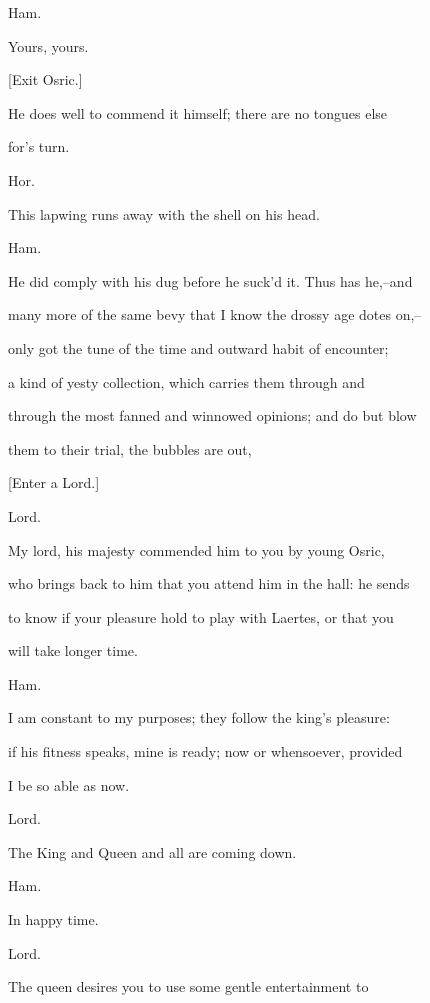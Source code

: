 \documentclass[12pt]{book}
\begin{document}
Ham.

Yours, yours.



[Exit Osric.]



He does well to commend it himself; there are no tongues else

for's turn.



Hor.

This lapwing runs away with the shell on his head.



Ham.

He did comply with his dug before he suck'd it. Thus has he,--and

many more of the same bevy that I know the drossy age dotes on,--

only got the tune of the time and outward habit of encounter;

a kind of yesty collection, which carries them through and

through the most fanned and winnowed opinions; and do but blow

them to their trial, the bubbles are out,



[Enter a Lord.]



Lord.

My lord, his majesty commended him to you by young Osric,

who brings back to him that you attend him in the hall: he sends

to know if your pleasure hold to play with Laertes, or that you

will take longer time.



Ham.

I am constant to my purposes; they follow the king's pleasure:

if his fitness speaks, mine is ready; now or whensoever, provided

I be so able as now.



Lord.

The King and Queen and all are coming down.



Ham.

In happy time.



Lord.

The queen desires you to use some gentle entertainment to
\end{document}
